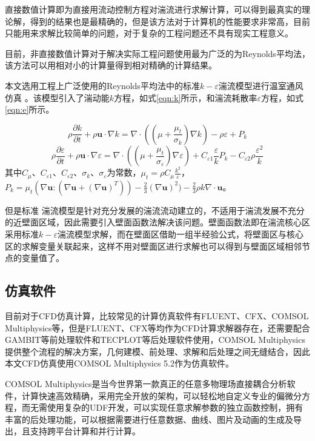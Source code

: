 直接数值计算即为直接用流动控制方程对湍流进行求解计算，可以得到最真实的理论解，得到的结果也是最精确的，但是该方法对于计算机的性能要求非常高，目前只能用来求解比较简单的问题，对于复杂的工程问题还不具有现实工程意义。

目前，非直接数值计算对于解决实际工程问题使用最为广泛的为Reynolds平均法，该方法可以用相对小的计算量得到相对精确的计算结果。

本文选用工程上广泛使用的Reynolds平均法中的标准$k-\varepsilon$湍流模型进行温室通风仿真\supercite{Sase2004,RenShougang2015,WuFeiqing2010} 。该模型引入了湍动能$k$方程，如式\ref{eqn:k}所示，和湍流耗散率$\varepsilon$方程，如式\ref{eqn:e}所示。

	\begin{equation}
		\label{eqn:k}
		\rho \frac{\partial k}{\partial t}+\rho \mathbf{u} \cdot \nabla k = \nabla \cdot ((\mu + \frac{\mu_t}{\sigma_k}) \nabla k) -\rho \varepsilon +P_k
	\end{equation}
	\begin{equation}
		\label{eqn:e}
		\rho \frac{\partial \varepsilon}{\partial t}+\rho \mathbf{u} \cdot \nabla \varepsilon = \nabla \cdot ((\mu + \frac{\mu_t}{\sigma_{\varepsilon}}) \nabla \varepsilon ) +C_{\varepsilon 1} \frac{\varepsilon}{k} P_k - C_{\varepsilon 2} \rho \frac{\varepsilon^2}{k}
	\end{equation}
其中$C_{\mu}$、$C_{\varepsilon 1}$、$C_{\varepsilon 2}$、$\sigma_k$、$\sigma_{\varepsilon}$为常数，$\mu_t =\rho C_{\mu} \frac{k^2}{\varepsilon}$，
$P_k=\mu_t(\nabla \mathbf{u}:( \nabla \mathbf{u}+( \nabla \mathbf{u})^T))-\frac{2}{3}(\nabla \mathbf{u})^2)-\frac{2}{3}\rho k \nabla \cdot \mathbf{u}$。

但是标准 湍流模型是针对充分发展的湍流流动建立的，不适用于湍流发展不充分的近壁面区域，因此需要引入壁面函数法解决该问题\supercite{WangFujun2004}。壁面函数法即在湍流核心区采用标准$k-\varepsilon$湍流模型求解，而在壁面区借助一组半经验公式，将壁面区与核心区的求解变量关联起来，这样不用对壁面区进行求解也可以得到与壁面区域相邻节点的变量值了。
	\subsection{仿真软件}
	目前对于CFD仿真计算，比较常见的计算仿真软件有FLUENT、CFX、COMSOL Multiphysics等，但是FLUENT、CFX等均作为CFD计算求解器存在，还需要配合GAMBIT等前处理软件和TECPLOT等后处理软件使用，COMSOL Multiphysics提供整个流程的解决方案，几何建模、前处理、求解和后处理之间无缝结合，因此本文CFD仿真使用COMSOL Multiphysics 5.2作为仿真软件。
	
COMSOL Multiphysics是当今世界第一款真正的任意多物理场直接耦合分析软件，计算快速高效精确，采用完全开放的架构，可以轻松地自定义专业的偏微分方程，而无需使用复杂的UDF开发，可以实现任意求解参数的独立函数控制，拥有丰富的后处理功能，可以根据需要进行任意数据、曲线、图片及动画的生成及导出，且支持跨平台计算和并行计算\supercite{Comsol2015}。

